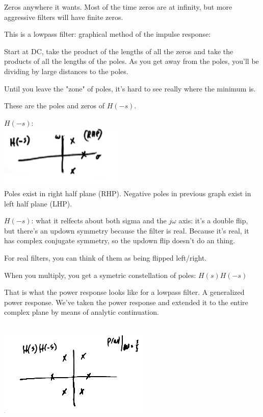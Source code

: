 Zeros anywhere it wants. 
Most of the time zeros are at infinity, but more aggressive filters will have
finite zeros.

This is a lowpass filter: graphical method of the impulse response:

Start at DC, take the product of the lengths of all the zeros and take the
products of all the lengths of the poles. As you get away from the poles,
you'll be dividing by large distances to the poles.

Until you leave the "zone" of poles, it's hard to see really where the minimum 
is. 

These are the poles and zeros of $H(-s)$. 

$H(-s)$:
\\
\includegraphics[scale=0.5]{frames/14b}\\

Poles exist in right half plane (RHP). Negative poles in previous graph
exist in left half plane (LHP). 

$H(-s)$: what it relfects about both sigma and the $j\omega$ axis: it's a
double flip, but there's an updown symmetry because the filter is real. Because
it's real, it has complex conjugate symmetry, so the updown flip doesn't do an thing.


For real filters, you can think of them as being flipped left/right.

When you multiply, you get a symetric constellation of poles:
$H(s)H(-s)$

That is what the power response looks like for a lowpass filter. A generalized
power response. We've taken the power response and extended it to the entire 
complex plane by means of analytic continuation. 

\\
\includegraphics[scale=0.5]{frames/14c}\\

